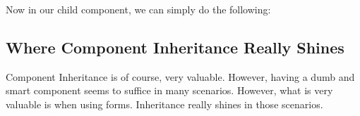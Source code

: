 Now in our child component, we can simply do the following:



\subsection{ Where Component Inheritance Really Shines }
Component Inheritance is of course, very valuable. However, having a dumb and
smart component seems to suffice in many scenarios. However, what is very
valuable is when using forms. Inheritance really shines in those scenarios. 
